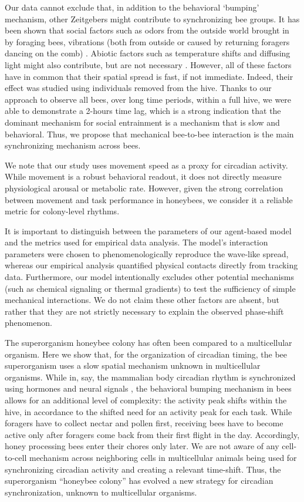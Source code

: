 \documentclass{article}
\newcommand{\added}[1]{{\color{blue}#1}}
\newcommand{\added}[1]{#1}
\begin{document}
Our data cannot exclude that, in addition to the behavioral ‘bumping’ mechanism, other Zeitgebers might contribute to synchronizing bee groups. It has been shown that social factors such as odors from the outside world brought in by foraging bees, vibrations (both from outside or caused by returning foragers dancing on the comb) \cite{moritz_self-organization_1994, siehler_colony_2020, siehler_remarkable_2021}. Abiotic factors such as temperature shifts and diffusing light might also contribute, but are not necessary \cite{siehler_remarkable_2021}. However, all of these factors have in common that their spatial spread is fast, if not immediate. Indeed, their effect was studied using individuals removed from the hive. Thanks to our approach to observe all bees, over long time periods, within a full hive, we were able to demonstrate a 2-hours time lag, which is a strong indication that the dominant mechanism for social entrainment is a mechanism that is slow and behavioral. Thus, we propose that mechanical bee-to-bee interaction is the main synchronizing mechanism across bees. 
 
\added{We note that our study uses movement speed as a proxy for circadian activity. While movement is a robust behavioral readout, it does not directly measure physiological arousal or metabolic rate. However, given the strong correlation between movement and task performance in honeybees, we consider it a reliable metric for colony-level rhythms.}

\added{It is important to distinguish between the parameters of our agent-based model and the metrics used for empirical data analysis. The model's interaction parameters were chosen to phenomenologically reproduce the wave-like spread, whereas our empirical analysis quantified physical contacts directly from tracking data. Furthermore, our model intentionally excludes other potential mechanisms (such as chemical signaling or thermal gradients) to test the sufficiency of simple mechanical interactions. We do not claim these other factors are absent, but rather that they are not strictly necessary to explain the observed phase-shift phenomenon.} 
 
The superorganism honeybee colony has often been compared to a multicellular organism. Here we show that, for the organization of circadian timing, the bee superorganism uses a slow spatial mechanism unknown in multicellular organisms. While in, say, the mammalian body circadian rhythm is synchronized using hormones and neural signals \cite{finger_coupled_2020, pilorz_concept_2020}, the behavioral bumping mechanism in bees allows for an additional level of complexity: the activity peak shifts within the hive, in accordance to the shifted need for an activity peak for each task. While foragers have to collect nectar and pollen first, receiving bees have to become active only after foragers come back from their first flight in the day. Accordingly, honey processing bees enter their chores only later. We are not aware of any cell-to-cell mechanism across neighboring cells in multicellular animals being used for synchronizing circadian activity and creating a relevant time-shift. Thus, the superorganism “honeybee colony” has evolved a new strategy for circadian synchronization, unknown to multicellular organisms. 
\end{document}
